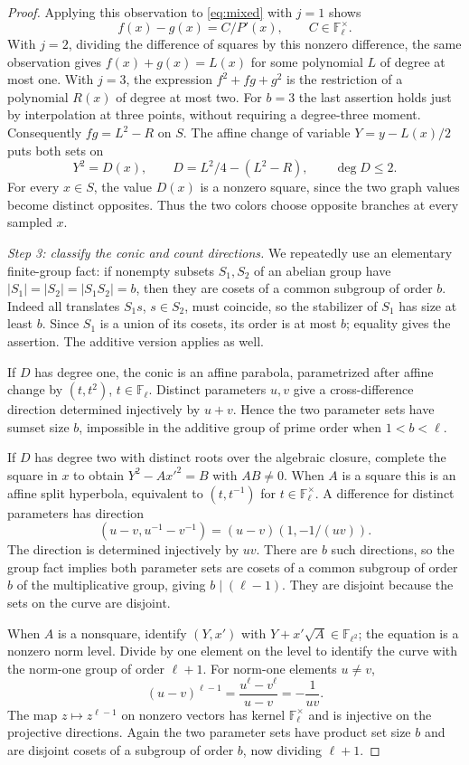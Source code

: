 \documentclass[11pt]{article}
\theoremstyle{remark}\newtheorem{remark}[theorem]{Remark}
\newcommand{\F}{\mathbb F}
\begin{document}
\begin{proof}
Applying this observation to \eqref{eq:mixed} with $j=1$ shows
\[
 f(x)-g(x)=C/P'(x),\qquad C\in\F_\ell^\times.
\]
With $j=2$, dividing the difference of squares by this nonzero difference, the same observation gives $f(x)+g(x)=L(x)$ for some polynomial $L$ of degree at most one. With $j=3$, the expression $f^2+fg+g^2$ is the restriction of a polynomial $R(x)$ of degree at most two. For $b=3$ the last assertion holds just by interpolation at three points, without requiring a degree-three moment. Consequently $fg=L^2-R$ on $S$. The affine change of variable $Y=y-L(x)/2$ puts both sets on
\begin{equation}\label{eq:conic}
 Y^2=D(x),\qquad D=L^2/4-(L^2-R),\qquad \deg D\le2.
\end{equation}
For every $x\in S$, the value $D(x)$ is a nonzero square, since the two graph values become distinct opposites. Thus the two colors choose opposite branches at every sampled $x$.

\emph{Step 3: classify the conic and count directions.} We repeatedly use an elementary finite-group fact: if nonempty subsets $S_1,S_2$ of an abelian group have $|S_1|=|S_2|=|S_1S_2|=b$, then they are cosets of a common subgroup of order $b$. Indeed all translates $S_1s$, $s\in S_2$, must coincide, so the stabilizer of $S_1$ has size at least $b$. Since $S_1$ is a union of its cosets, its order is at most $b$; equality gives the assertion. The additive version applies as well.

If $D$ has degree one, the conic is an affine parabola, parametrized after affine change by $(t,t^2)$, $t\in\F_\ell$. Distinct parameters $u,v$ give a cross-difference direction determined injectively by $u+v$. Hence the two parameter sets have sumset size $b$, impossible in the additive group of prime order when $1<b<\ell$.

If $D$ has degree two with distinct roots over the algebraic closure, complete the square in $x$ to obtain $Y^2-Ax'^2=B$ with $AB\ne0$. When $A$ is a square this is an affine split hyperbola, equivalent to $(t,t^{-1})$ for $t\in\F_\ell^\times$. A difference for distinct parameters has direction
\[
 (u-v,u^{-1}-v^{-1})=(u-v)(1,-1/(uv)).
\]
The direction is determined injectively by $uv$. There are $b$ such directions, so the group fact implies both parameter sets are cosets of a common subgroup of order $b$ of the multiplicative group, giving $b\mid(\ell-1)$. They are disjoint because the sets on the curve are disjoint.

When $A$ is a nonsquare, identify $(Y,x')$ with $Y+x'\sqrt A\in\F_{\ell^2}$; the equation is a nonzero norm level. Divide by one element on the level to identify the curve with the norm-one group of order $\ell+1$. For norm-one elements $u\ne v$,
\[
 (u-v)^{\ell-1}=\frac{u^\ell-v^\ell}{u-v}=-\frac1{uv}.
\]
The map $z\mapsto z^{\ell-1}$ on nonzero vectors has kernel $\F_\ell^\times$ and is injective on the projective directions. Again the two parameter sets have product set size $b$ and are disjoint cosets of a subgroup of order $b$, now dividing $\ell+1$.


\end{proof}
\end{document}
